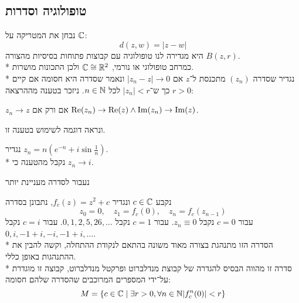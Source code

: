 \subsection{טופולוגיה וסדרות}
נבחן את המטריקה על $\mathbb{C}$:
\[
	d(z, w) = |z - w|
\]
היא מגדירה לנו טופולוגיה עם קבוצות פתוחות בסיסיות מהצורה $B(z, r)$. \\*
כמרחב טופולוגי או נורמי, $\mathbb{C} \cong \mathbb{R}^2$ ולכן התכונות מושרות. \\*
נגדיר שסדרה $(z_n)$ מתכנסת ל־$z$ אם $|z_n - z| \to 0$ ונאמר שסדרה היא חסומה אם קיים $r > 0$ כך ש־$|z_n| < r$ לכל $n \in \mathbb{N}$.
ניזכר בטענה מההרצאה:
\begin{proposition}
	$z_n \to z$ אם ורק אם $\operatorname{Re}(z_n) \to \operatorname{Re}(z) \land \operatorname{Im}(z_n) \to \operatorname{Im}(z)$.
\end{proposition}
ונראה דוגמה לשימוש בטענה זו.
\begin{example}
	נגדיר $z_n = n(e^{-n} + i \sin \frac{1}{n})$. \\*
	נקבל מהטענה כי $z_n \to i$.
\end{example}
נעבור לסדרה מעניינת יותר
\begin{example}
	נקבע $c \in \mathbb{C}$ ונגדיר $f_c(z) = z^2 + c$, נתבונן בסדרה
	\[
		z_0 = 0,
		\quad z_1 = f_c(0),
		\quad z_n = f_c(z_{n - 1})
	\]
	עבור $c = 0$ נקבל $z_n \equiv 0$.
	עבור $c = 1$ נקבל $0, 1, 2, 5, 26, \dots$.
	עבור $c = i$ נקבל $0, i, -1 + i, -i, -1 + i, \dots$. \\*
	הסדרה הזו מתנהגת בצורה מאוד משונה בהתאם לנקודת ההתחלה, וקשה להבין את ההתנהגות באופן כללי. \\*
	סדרה זו מהווה הבסיס להגדרה של קבוצת מנדלברוט ופרקטל מנדלברוט, קבוצה זו מוגדרת על־ידי המספרים המרוכבים שהסדרה שלהם חסומה:
	\[
		M = \{ c \in \mathbb{C} \mid \exists r > 0, \forall n \in \mathbb{N} |f_c^n(0)| < r \}
	\]
\end{example}

